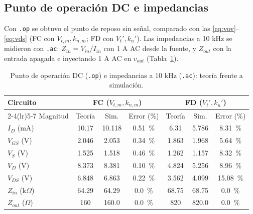 \documentclass[conference]{IEEEtran}
\newcommand{\Vtp}{V_t'}
\newcommand{\knp}{k_n'}
\newcommand{\Vtm}{V_{t,m}}
\newcommand{\knm}{k_{n,m}}
\begin{document}
\subsection{Punto de operación DC e impedancias}
\label{sec:sim_op}
Con \texttt{.op} se obtuvo el punto de reposo sin señal, comparado con las \eqref{eq:vov}--\eqref{eq:vds} (FC con $\Vtm,\knm$; FD con $\Vtp,\knp$). Las impedancias a 10 kHz se midieron con \texttt{.ac}: $Z_{in}=V_{in}/I_{in}$ con 1 A AC desde la fuente, y $Z_{out}$ con la entrada apagada e inyectando 1 A AC en $v_{out}$ (Tabla~\ref{tab:op}).

\begin{table}[htbp]
\centering
\caption{Punto de operación DC (\texttt{.op}) e impedancias a 10 kHz (\texttt{.ac}): teoría frente a simulación.}
\label{tab:op}
\scriptsize
\renewcommand{\arraystretch}{1.03}
\setlength{\tabcolsep}{2.5pt}
\begin{tabular}{@{}lcccccc@{}}
\toprule
Circuito & \multicolumn{3}{c}{FC ($\Vtm,\knm$)} & \multicolumn{3}{c}{FD ($\Vtp,\knp$)} \\
\cmidrule(lr){2-4}\cmidrule(lr){5-7}
Magnitud & Teoría & Sim. & Error (\%) & Teoría & Sim. & Error (\%) \\
\midrule
$I_D$ (mA) & 10.17 & 10.118 & \SI{0.51}{\percent} & 6.31 & 5.786 & \SI{8.31}{\percent} \\
$V_{GS}$ (V) & 2.046 & 2.053 & \SI{0.34}{\percent} & 1.863 & 1.968 & \SI{5.64}{\percent} \\
$V_S$ (V) & 1.525 & 1.518 & \SI{0.46}{\percent} & 1.262 & 1.157 & \SI{8.32}{\percent} \\
$V_D$ (V) & 8.373 & 8.381 & \SI{0.10}{\percent} & 4.824 & 5.256 & \SI{8.96}{\percent} \\
$V_{DS}$ (V) & 6.848 & 6.863 & \SI{0.22}{\percent} & 3.562 & 4.099 & \SI{15.08}{\percent} \\
$Z_{in}$ (k$\Omega$) & 64.29 & 64.29 & \SI{0.0}{\percent} & 68.75 & 68.75 & \SI{0.0}{\percent} \\
$Z_{out}$ ($\Omega$) & 160 & 160.0 & \SI{0.0}{\percent} & 820 & 820.0 & \SI{0.0}{\percent} \\
\bottomrule
\end{tabular}
\end{table}
\end{document}
